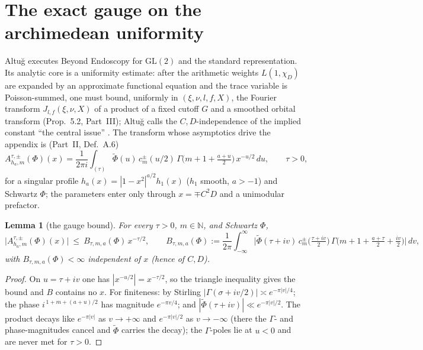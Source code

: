 \documentclass[11pt]{article}
\newtheorem{lemma}[theorem]{Lemma}
\theoremstyle{definition}
\newcommand{\wt}[1]{\widetilde{#1}}
\begin{document}
\section{The exact gauge on the archimedean uniformity}\label{sec:gauge}

Altu\u{g} \cite{AltI,AltII,AltIII} executes Beyond Endoscopy for $\mathrm{GL}(2)$ and the standard
representation. Its analytic core is a uniformity estimate: after the arithmetic weights $L(1,\chi_D)$
are expanded by an approximate functional equation and the trace variable is Poisson-summed, one must
bound, uniformly in $(\xi,\nu,l,f,X)$, the Fourier transform $J_{l,f}(\xi,\nu,X)$ of a product of a
fixed cutoff $G$ and a smoothed orbital transform (Prop.~5.2, Part~III); Altu\u{g} calls the
$C,D$-independence of the implied constant ``the central issue'' \cite[App.~A]{AltII}. The transform
whose asymptotics drive the appendix is (Part~II, Def.~A.6)
\begin{equation}\label{eq:A6}
  A^{\tau,\pm}_{h_a,m}(\Phi)(x)=\frac{1}{2\pi i}\int_{(\tau)}\wt\Phi(u)\,c^{\pm}_m(u/2)\,
    \Gamma\!\Big(m+1+\tfrac{a+u}{2}\Big)\,x^{-u/2}\,du,\qquad \tau>0,
\end{equation}
for a singular profile $h_a(x)=|1-x^2|^{a/2}h_1(x)$ ($h_1$ smooth, $a>-1$) and Schwartz $\Phi$; the
parameters enter only through $x=\mp C^2D$ and a unimodular prefactor.

\begin{lemma}[the gauge bound]\label{lem:mag}
For every $\tau>0$, $m\in\mathbb N$, and Schwartz $\Phi$,
\[
  \big|A^{\tau,\pm}_{h_a,m}(\Phi)(x)\big|\ \le\ B_{\tau,m,a}(\Phi)\,x^{-\tau/2},
  \qquad
  B_{\tau,m,a}(\Phi):=\frac{1}{2\pi}\!\int_{-\infty}^{\infty}\!
     \Big|\wt\Phi(\tau+iv)\,c^\pm_m\!\big(\tfrac{\tau+iv}{2}\big)\,
     \Gamma\!\big(m{+}1{+}\tfrac{a+\tau}{2}{+}\tfrac{iv}{2}\big)\Big|\,dv,
\]
with $B_{\tau,m,a}(\Phi)<\infty$ \emph{independent of $x$} (hence of $C,D$).
\end{lemma}

\begin{proof}
On $u=\tau+iv$ one has $|x^{-u/2}|=x^{-\tau/2}$, so the triangle inequality gives the bound and $B$
contains no $x$. For finiteness: by Stirling $|\Gamma(\sigma+iv/2)|\asymp e^{-\pi|v|/4}$; the phase
$i^{\,1+m+(a+u)/2}$ has magnitude $e^{-\pi v/4}$; and $|\wt\Phi(\tau+iv)|\ll e^{-\pi|v|/2}$. The
product decays like $e^{-\pi|v|}$ as $v\to+\infty$ and $e^{-\pi|v|/2}$ as $v\to-\infty$ (there the
$\Gamma$- and phase-magnitudes cancel and $\wt\Phi$ carries the decay); the $\Gamma$-poles lie at
$u<0$ and are never met for $\tau>0$.
\end{proof}
\end{document}
